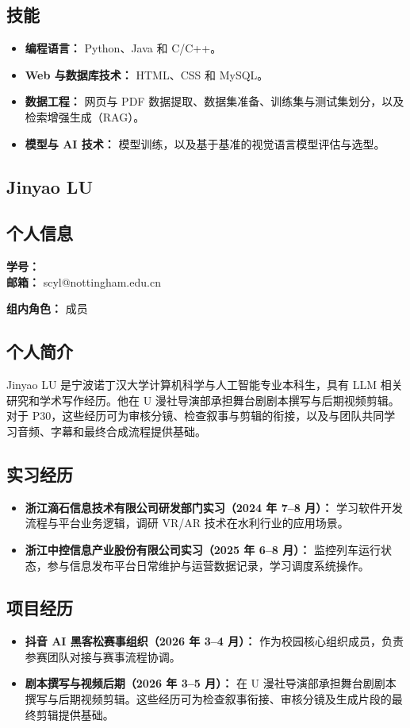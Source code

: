 \documentclass[a4paper,12pt]{article}
\newcommand{\PersonalInformation}[2]{%
  \subsection*{个人信息}
  \if\relax\detokenize{#1}\relax\else
  \noindent\textbf{学号：} #1\\
  \fi
  \textbf{邮箱：} #2\par
}
\begin{document}
\subsection*{技能}
\begin{itemize}
  \item \textbf{编程语言：} Python、Java 和 C/C++。
  \item \textbf{Web 与数据库技术：} HTML、CSS 和 MySQL。
  \item \textbf{数据工程：} 网页与 PDF 数据提取、数据集准备、训练集与测试集划分，以及检索增强生成（RAG）。
  \item \textbf{模型与 AI 技术：} 模型训练，以及基于基准的视觉语言模型评估与选型。
\end{itemize}

\subsection{Jinyao LU}
\PersonalInformation{}{scyl@nottingham.edu.cn}
\noindent\textbf{组内角色：} 成员\par

\subsection*{个人简介}
Jinyao LU 是宁波诺丁汉大学计算机科学与人工智能专业本科生，具有 LLM 相关研究和学术写作经历。他在 U 漫社导演部承担舞台剧剧本撰写与后期视频剪辑。对于 P30，这些经历可为审核分镜、检查叙事与剪辑的衔接，以及与团队共同学习音频、字幕和最终合成流程提供基础。

\subsection*{实习经历}
\begin{itemize}
  \item \textbf{浙江滴石信息技术有限公司研发部门实习（2024 年 7--8 月）：} 学习软件开发流程与平台业务逻辑，调研 VR/AR 技术在水利行业的应用场景。
  \item \textbf{浙江中控信息产业股份有限公司实习（2025 年 6--8 月）：} 监控列车运行状态，参与信息发布平台日常维护与运营数据记录，学习调度系统操作。
\end{itemize}

\subsection*{项目经历}
\begin{itemize}
  \item \textbf{抖音 AI 黑客松赛事组织（2026 年 3--4 月）：} 作为校园核心组织成员，负责参赛团队对接与赛事流程协调。
  \item \textbf{剧本撰写与视频后期（2026 年 3--5 月）：} 在 U 漫社导演部承担舞台剧剧本撰写与后期视频剪辑。这些经历可为检查叙事衔接、审核分镜及生成片段的最终剪辑提供基础。
\end{itemize}
\end{document}
